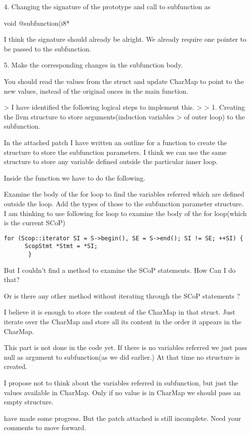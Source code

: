 \documentclass[a4paper,10pt]{article}
\begin{document}
4. Changing the signature of the prototype and call to subfunction  as

void @subfunction(i8* %

I think the signature should already be alright. We already require one pointer to be passed to the subfunction.


5. Make the corresponding changes in the subfunction body.

You should read the values from the struct and update CharMap to point to the new values, instead of the original onces in the main function.

> I have identified the following logical steps to implement this.
>
> 1. Creating the llvm structure to store arguments(induction variables
    > of outer loop) to the subfunction.

In the attached patch I have written an outline for a function to
create the structure to store the subfunction parameters. I think we
can use the same structure to store any variable defined outside the
particular inner loop.

Inside the function we have to do the following.

Examine the body of the for loop to find the variables referred which
are defined outside the loop. Add the types of those to the
subfunction parameter structure. I am thinking to use following for
loop to examine the body of the  for loop(which is the current SCoP)
\begin{verbatim}
for (Scop::iterator SI = S->begin(), SE = S->end(); SI != SE; ++SI) {
      ScopStmt *Stmt = *SI;
       }
\end{verbatim}
But I couldn't find a method to examine the SCoP statements. How Can I do that?

  Or is there any other method without iterating through the SCoP statements ?

I believe it is enough to store the content of the CharMap in that struct. Just iterate over the CharMap and store all its content in the order it appears in the CharMap.

This part is not done in the code yet. If there is no variables
referred we just pass null as argument to subfunction(as we did
    earlier.) At that time no structure is created.


I propose not to think about the variables referred in subfunction, but just the values available in CharMap. Only if no value is in CharMap we should pass an empty structure.


have made some progress. But the patch attached is still incomplete.
Need your comments to move forward.
\end{document}
